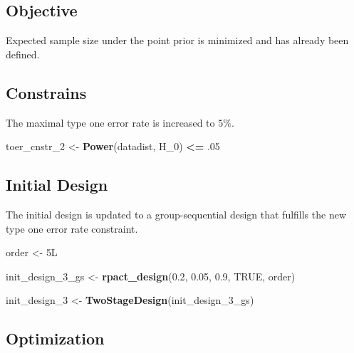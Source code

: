 \documentclass[]{book}
\newenvironment{Shaded}{\begin{snugshade}}{\end{snugshade}}
\newcommand{\DecValTok}[1]{\textcolor[rgb]{0.00,0.00,0.81}{#1}}
\newcommand{\FloatTok}[1]{\textcolor[rgb]{0.00,0.00,0.81}{#1}}
\newcommand{\KeywordTok}[1]{\textcolor[rgb]{0.13,0.29,0.53}{\textbf{#1}}}
\newcommand{\NormalTok}[1]{#1}
\newcommand{\OperatorTok}[1]{\textcolor[rgb]{0.81,0.36,0.00}{\textbf{#1}}}
\newcommand{\OtherTok}[1]{\textcolor[rgb]{0.56,0.35,0.01}{#1}}
\newcommand{\StringTok}[1]{\textcolor[rgb]{0.31,0.60,0.02}{#1}}
\begin{document}
\hypertarget{objective-9}{%
\subsection{Objective}\label{objective-9}}

Expected sample size under the point prior is minimized and has already been
defined.

\hypertarget{constrains-9}{%
\subsection{Constrains}\label{constrains-9}}

The maximal type one error rate is increased to \(5\%\).

\begin{Shaded}
\begin{Highlighting}[]
\NormalTok{toer_cnstr_}\DecValTok{2}\NormalTok{ <-}\StringTok{ }\KeywordTok{Power}\NormalTok{(datadist, H_}\DecValTok{0}\NormalTok{) }\OperatorTok{<=}\StringTok{ }\FloatTok{.05}
\end{Highlighting}
\end{Shaded}

\hypertarget{initial-design-7}{%
\subsection{Initial Design}\label{initial-design-7}}

The initial design is updated to a group-sequential design that fulfills
the new type one error rate constraint.

\begin{Shaded}
\begin{Highlighting}[]
\NormalTok{order <-}\StringTok{ }\NormalTok{5L }

\NormalTok{init_design_}\DecValTok{3}\NormalTok{_gs <-}\StringTok{ }\KeywordTok{rpact_design}\NormalTok{(}\FloatTok{0.2}\NormalTok{, }\FloatTok{0.05}\NormalTok{, }\FloatTok{0.9}\NormalTok{, }\OtherTok{TRUE}\NormalTok{, order)}

\NormalTok{init_design_}\DecValTok{3}\NormalTok{    <-}\StringTok{ }\KeywordTok{TwoStageDesign}\NormalTok{(init_design_}\DecValTok{3}\NormalTok{_gs)}
\end{Highlighting}
\end{Shaded}

\hypertarget{optimization-8}{%
\subsection{Optimization}\label{optimization-8}}
\end{document}
